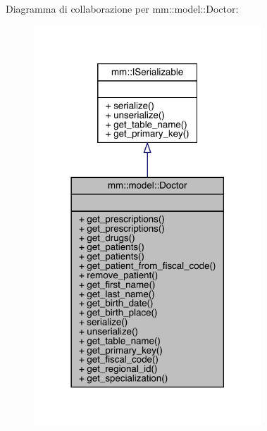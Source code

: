 Diagramma di collaborazione per mm\+:\+:model\+:\+:Doctor\+:\nopagebreak
\begin{figure}[H]
\begin{center}
\leavevmode
\includegraphics[width=242pt]{da/d19/classmm_1_1model_1_1_doctor__coll__graph}
\end{center}
\end{figure}
